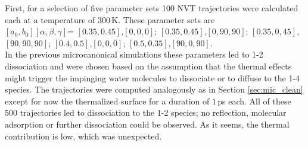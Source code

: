 \documentclass[11pt,DIV=13,BCOR=5mm,a4paper,headinclude]{scrbook}
\begin{document}
First, for a selection of five parameter sets 100 NVT trajectories were calculated each at a temperature of $300\,$K.
These parameter sets are\\ $[a_0,b_0][\alpha,\beta,\gamma]$= $[0.35,0.45]$,$[0,0,0]$; $[0.35,0.45]$,$[0,90,90]$; $[0.35,0,45]$,$[90,90,90]$; $[0.4,0.5]$,$[0,0,0]$;  $[0.5,0.35]$,$[90,0,90]$.\\
In the previous microcanonical simulations these parameters led to 1-2 dissociation and were chosen based on the assumption that the thermal effects might trigger the impinging water molecules to dissociate or to diffuse to the 1-4 species.
The trajectories were computed analogously as in Section \ref{sec:mic_clean} except for now the thermalized surface for a duration of $1\,$ps each.
All of these 500 trajectories led to dissociation to the 1-2 species; no reflection, molecular adsorption or further dissociation could be observed.
As it seems, the thermal contribution is low, which was unexpected.
\end{document}
